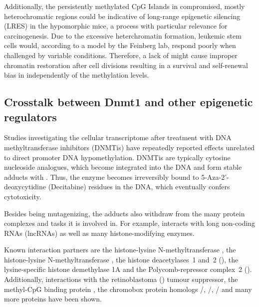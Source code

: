 Additionally, the persistently methylated CpG Islands in compromised, mostly heterochromatic regions could be indicative of long-range epigenetic silencing (LRES) in the hypomorphic mice, a process with particular relevance for carcinogenesis\cite{Clark2007}. Due to the excessive heterchromatin formation, \dnmtchip \mllafnine leukemic stem cells would, according to a model by the Feinberg lab\cite{Pujadas2012}, respond poorly when challenged by variable conditions. Therefore, a lack of  might cause improper chromatin restoration after cell divisions resulting in a survival and self-renewal bias in \dnmtchip independently of the methylation levels.

\subsection{Crosstalk between Dnmt1 and other epigenetic regulators}
\label{chap:d:strain:dnmtonealtfunct:crosstalk}

Studies investigating the cellular transcriptome after treatment with DNA methyltransferase inhibitors (DNMTis) have repeatedly reported effects unrelated to direct promoter DNA hypomethylation\cite{Schmelz2005,Flotho2009}. DNMTis are typically cytosine nucleoside analogues, which become integrated into the DNA and form stable adducts with \cite{Christman2002}. Thus, the enzyme becomes irreversibly bound to 5-Aza-2'-deoxycytidine (Decitabine) residues in the DNA, which eventually confers cytotoxicity\cite{Juettermann1994}.

Besides being mutagenizing\cite{Jackson-Grusby1997}, the adducts also withdraw  from the many protein complexes and tasks it is involved in.  For example,  interacts with long non-coding RNAs (lncRNAs)\cite{DiRuscio2013} as well as many histone-modifying enzymes.

Known interaction partners are the histone-lysine N-methyltransferase  \cite{Esteve2006}, the histone-lysine N-methyltransferase \cite{Fuks2003}, the histone deacetylases~1 and~2 ()\cite{Fuks2000,Rountree2000}, the lysine-specific histone demethylase 1A \cite{Wang2009a,Clements2012} and the Polycomb-repressor complex~2 ()\cite{Vire2006,Symmank2018}. Additionally, interactions with the retinoblastoma () tumour suppressor\cite{Robertson2000,Pradhan2002}, the methyl-CpG binding protein \cite{Kimura2003}, the chromobox protein homologs /, /, /\cite{Smallwood2007} and many more proteins  have been shown. 

